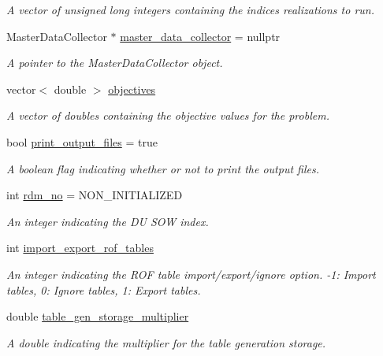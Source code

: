 \begin{DoxyCompactItemize}
\begin{DoxyCompactList}\small\item\em A vector of unsigned long integers containing the indices realizations to run. \end{DoxyCompactList}\item 
Master\+Data\+Collector $\ast$ \mbox{\hyperlink{classProblem_a6cd1db1d587a449985d6514390ba8c96}{master\+\_\+data\+\_\+collector}} = nullptr
\begin{DoxyCompactList}\small\item\em A pointer to the Master\+Data\+Collector object. \end{DoxyCompactList}\item 
vector$<$ double $>$ \mbox{\hyperlink{classProblem_a72750ee8c8117f5ee9b190a359d6a60d}{objectives}}
\begin{DoxyCompactList}\small\item\em A vector of doubles containing the objective values for the problem. \end{DoxyCompactList}\item 
bool \mbox{\hyperlink{classProblem_a3372a73270ce989f5d2056cace66215b}{print\+\_\+output\+\_\+files}} = true
\begin{DoxyCompactList}\small\item\em A boolean flag indicating whether or not to print the output files. \end{DoxyCompactList}\item 
int \mbox{\hyperlink{classProblem_a8e1d46a8dca514e4973b00a038480fc2}{rdm\+\_\+no}} = N\+O\+N\+\_\+\+I\+N\+I\+T\+I\+A\+L\+I\+Z\+ED
\begin{DoxyCompactList}\small\item\em An integer indicating the DU S\+OW index. \end{DoxyCompactList}\item 
int \mbox{\hyperlink{classProblem_ac5a286f34cec786a0ad56c77783a201c}{import\+\_\+export\+\_\+rof\+\_\+tables}}
\begin{DoxyCompactList}\small\item\em An integer indicating the R\+OF table import/export/ignore option. -\/1\+: Import tables, 0\+: Ignore tables, 1\+: Export tables. \end{DoxyCompactList}\item 
double \mbox{\hyperlink{classProblem_a27cae146b3409021f6d5936404cd1083}{table\+\_\+gen\+\_\+storage\+\_\+multiplier}}
\begin{DoxyCompactList}\small\item\em A double indicating the multiplier for the table generation storage. \end{DoxyCompactList}\item 

\end{DoxyCompactItemize}
